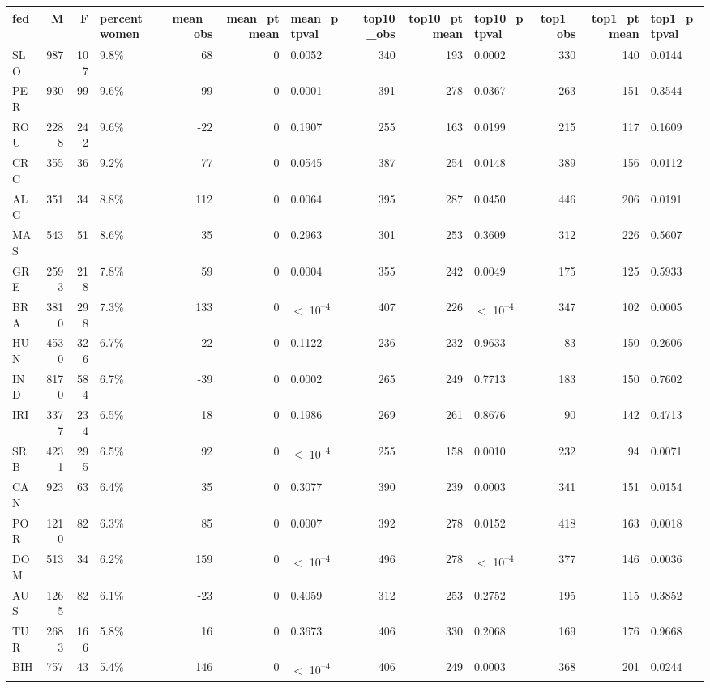 
\begin{tabular}[t]{lrrlrrlrrlrrl}
\toprule
fed & M & F & percent_women & mean_obs & mean_ptmean & mean_ptpval & top10_obs & top10_ptmean & top10_ptpval & top1_obs & top1_ptmean & top1_ptpval\\
\midrule
SLO & 987 & 107 & 9.8\% & 68 & 0 & 0.0052 & 340 & 193 & 0.0002 & 330 & 140 & 0.0144\\
PER & 930 & 99 & 9.6\% & 99 & 0 & 0.0001 & 391 & 278 & 0.0367 & 263 & 151 & 0.3544\\
ROU & 2288 & 242 & 9.6\% & -22 & 0 & 0.1907 & 255 & 163 & 0.0199 & 215 & 117 & 0.1609\\
CRC & 355 & 36 & 9.2\% & 77 & 0 & 0.0545 & 387 & 254 & 0.0148 & 389 & 156 & 0.0112\\
ALG & 351 & 34 & 8.8\% & 112 & 0 & 0.0064 & 395 & 287 & 0.0450 & 446 & 206 & 0.0191\\
MAS & 543 & 51 & 8.6\% & 35 & 0 & 0.2963 & 301 & 253 & 0.3609 & 312 & 226 & 0.5607\\
GRE & 2593 & 218 & 7.8\% & 59 & 0 & 0.0004 & 355 & 242 & 0.0049 & 175 & 125 & 0.5933\\
BRA & 3810 & 298 & 7.3\% & 133 & 0 & $<$ 10\textsuperscript{--4} & 407 & 226 & $<$ 10\textsuperscript{--4} & 347 & 102 & 0.0005\\
HUN & 4530 & 326 & 6.7\% & 22 & 0 & 0.1122 & 236 & 232 & 0.9633 & 83 & 150 & 0.2606\\
IND & 8170 & 584 & 6.7\% & -39 & 0 & 0.0002 & 265 & 249 & 0.7713 & 183 & 150 & 0.7602\\
IRI & 3377 & 234 & 6.5\% & 18 & 0 & 0.1986 & 269 & 261 & 0.8676 & 90 & 142 & 0.4713\\
SRB & 4231 & 295 & 6.5\% & 92 & 0 & $<$ 10\textsuperscript{--4} & 255 & 158 & 0.0010 & 232 & 94 & 0.0071\\
CAN & 923 & 63 & 6.4\% & 35 & 0 & 0.3077 & 390 & 239 & 0.0003 & 341 & 151 & 0.0154\\
POR & 1210 & 82 & 6.3\% & 85 & 0 & 0.0007 & 392 & 278 & 0.0152 & 418 & 163 & 0.0018\\
DOM & 513 & 34 & 6.2\% & 159 & 0 & $<$ 10\textsuperscript{--4} & 496 & 278 & $<$ 10\textsuperscript{--4} & 377 & 146 & 0.0036\\
AUS & 1265 & 82 & 6.1\% & -23 & 0 & 0.4059 & 312 & 253 & 0.2752 & 195 & 115 & 0.3852\\
TUR & 2683 & 166 & 5.8\% & 16 & 0 & 0.3673 & 406 & 330 & 0.2068 & 169 & 176 & 0.9668\\
BIH & 757 & 43 & 5.4\% & 146 & 0 & $<$ 10\textsuperscript{--4} & 406 & 249 & 0.0003 & 368 & 201 & 0.0244\\

\end{tabular}
